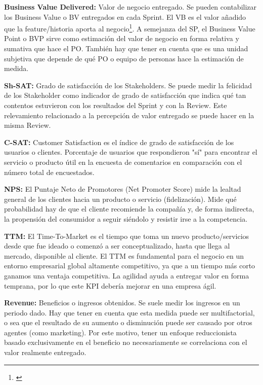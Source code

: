   \begin{description}    

  \item {\textbf{Business Value Delivered:} Valor de negocio entregado. Se pueden contabilizar los Business Value o BV entregados en cada Sprint. El VB es el valor añadido que la feature/historia aporta al negocio\footnote{\cite{Pointet-Botton-2012}}. A semejanza del SP, el Business Value Point o BVP sirve como estimación del valor de negocio en forma relativa y sumativa que hace el PO. También hay que tener en cuenta que es una unidad subjetiva que depende de qué PO o equipo de personas hace la estimación de medida.
} 
 
  \item {\textbf{Sh-SAT:} Grado de satisfacción de los Stakeholders. Se puede medir la felicidad de los Stakeholder como indicador de grado de satisfacción que indica qué tan contentos estuvieron con los resultados del Sprint y con la Review. Este relevamiento relacionado a la percepción de valor entregado se puede hacer en la misma Review.
}

  \item {\textbf{C-SAT:} Customer Satisfaction es el índice de grado de satisfacción de los usuarios o clientes. Porcentaje de usuarios que respondieron "sí" para encontrar el servicio o producto útil en la encuesta de comentarios en comparación con el número total de encuestados.
}

  \item {\textbf{NPS:} El Puntaje Neto de Promotores (Net Promoter Score) mide la lealtad general de los clientes hacia un producto o servicio (fidelización). Mide qué probabilidad hay de que el cliente recomiende la compañía y, de forma indirecta, la propensión del consumidor a seguir siéndolo y resistir irse a la competencia.
}

  \item {\textbf{TTM:}
El Time-To-Market es el tiempo que toma un nuevo producto/servicios desde que fue ideado o comenzó a ser conceptualizado, hasta que llega al mercado, disponible al cliente. El TTM es fundamental para el negocio en un entorno empresarial global altamente competitivo, ya que a un tiempo más corto ganamos una ventaja competitiva. La agilidad ayuda a entregar valor en forma temprana, por lo que este KPI debería mejorar en una empresa ágil.
}

  \item {\textbf{Revenue:} Beneficios o ingresos obtenidos. Se suele medir los ingresos en un periodo dado. Hay que tener en cuenta que esta medida puede ser multifactorial, o sea que el resultado de su aumento o disminución puede ser causado por otros agentes (como marketing). Por este motivo, tener un enfoque reduccionista basado exclusivamente en el beneficio no necesariamente se correlaciona con el valor realmente entregado.
}


\end{description}
